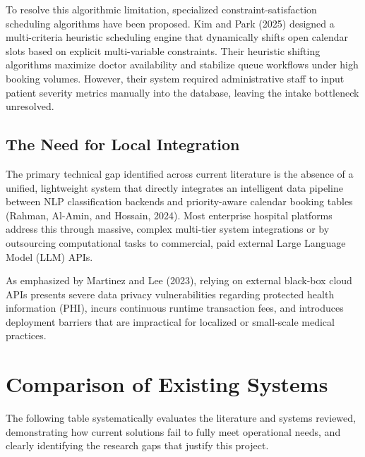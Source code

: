 \documentclass[12pt,a4paper]{report}
\begin{document}
To resolve this algorithmic limitation, specialized constraint-satisfaction scheduling algorithms have been proposed. Kim and Park (2025) designed a multi-criteria heuristic scheduling engine that dynamically shifts open calendar slots based on explicit multi-variable constraints. Their heuristic shifting algorithms maximize doctor availability and stabilize queue workflows under high booking volumes. However, their system required administrative staff to input patient severity metrics manually into the database, leaving the intake bottleneck unresolved.

\subsection{The Need for Local Integration}
The primary technical gap identified across current literature is the absence of a unified, lightweight system that directly integrates an intelligent data pipeline between NLP classification backends and priority-aware calendar booking tables (Rahman, Al-Amin, and Hossain, 2024). Most enterprise hospital platforms address this through massive, complex multi-tier system integrations or by outsourcing computational tasks to commercial, paid external Large Language Model (LLM) APIs. 

As emphasized by Martinez and Lee (2023), relying on external black-box cloud APIs presents severe data privacy vulnerabilities regarding protected health information (PHI), incurs continuous runtime transaction fees, and introduces deployment barriers that are impractical for localized or small-scale medical practices.

\section{Comparison of Existing Systems}
The following table systematically evaluates the literature and systems reviewed, demonstrating how current solutions fail to fully meet operational needs, and clearly identifying the research gaps that justify this project.
\end{document}
